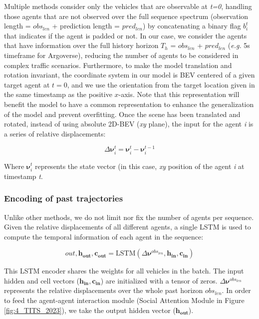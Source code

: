Multiple methods \cite{liang2020learning, schmidt2022crat} consider only the vehicles that are observable at \textit{t=0}, handling those agents that are not observed over the full sequence spectrum (observation length = \textit{$obs_{len}$} + prediction length = \textit{$pred_{len}$}) by concatenating a binary flag $b_i^t$ that indicates if the agent is padded or not. In our case, we consider the agents that have information over the full history horizon $T_h$ = \textit{$obs_{len}$} + \textit{$pred_{len}$} (\emph{e.g.} 5s timeframe for Argoverse), reducing the number of agents to be considered in complex traffic scenarios. Furthermore, to make the model translation and rotation invariant, the coordinate system in our model is \ac{BEV} centered of a given target agent at $t = 0$, and we use the orientation from the target location given in the same timestamp as the positive $x$-axis. Note that this representation will benefit the model to have a common representation to enhance the generalization of the model and prevent overfitting. Once the scene has been translated and rotated, instead of using absolute 2D-BEV (\textit{xy} plane), the input for the agent \textit{i} is a series of relative displacements:

\begin{equation}
	\Delta \boldsymbol{\nu}^{t}_i = \boldsymbol{\nu}^{t}_i - \boldsymbol{\nu}^{t-1}_i
\end{equation}

Where $\boldsymbol{\nu}^{t}_i$ represents the state vector (in this case, \textit{xy} position of the agent \textit{i} at timestamp \textit{t}.

\subsubsection{Encoding of past trajectories}
\label{subsubsec:4_efficient_baselines_social_encoding}

Unlike other methods, we do not limit nor fix the number of agents per sequence. Given the relative displacements of all different agents, a single \ac{LSTM} is used to compute the temporal information of each agent in the sequence:

\begin{equation}
	out, \mathbf{h_{out}}, \mathbf{c_{out}} = \mathrm{LSTM}(\Delta \boldsymbol{\nu}^{obs_{len}}, \mathbf{h_{in}}, \mathbf{c_{in}})
\end{equation}

This LSTM encoder shares the weights for all vehicles in the batch. The input hidden and cell vectors ($\mathbf{h_{in}}, \mathbf{c_{in}}$) are initialized with a tensor of zeros. $\Delta \boldsymbol{\nu}^{obs_{len}}$ represents the relative displacements over the whole past horizon $obs_{len}$. In order to feed the agent-agent interaction module (Social Attention Module in Figure \ref{fig:4_TITS_2023}), we take the output hidden vector ($\mathbf{h_{out}}$).

